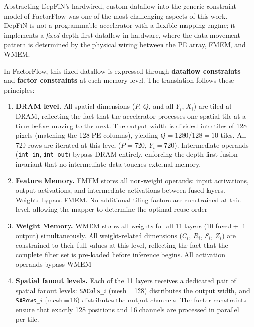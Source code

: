 Abstracting DepFiN's hardwired, custom dataflow into the generic
constraint model of FactorFlow was one of the most challenging aspects
of this work.
DepFiN is not a programmable accelerator with a flexible mapping
engine; it implements a \emph{fixed} depth-first dataflow in hardware,
where the data movement pattern is determined by the physical wiring
between the PE array, FMEM, and WMEM.

In FactorFlow, this fixed dataflow is expressed through
\textbf{dataflow constraints} and \textbf{factor constraints} at each
memory level.
The translation follows these principles:

\begin{enumerate}
  \item \textbf{DRAM level.}
        All spatial dimensions ($P$, $Q$, and all $Y_i$, $X_i$) are
        tiled at DRAM, reflecting the fact that the accelerator
        processes one spatial tile at a time before moving to the next.
        The output width is divided into tiles of 128 pixels (matching
        the 128 PE columns), yielding $Q = 1280/128 = 10$ tiles.
        All 720 rows are iterated at this level ($P = 720$, $Y_i = 720$).
        Intermediate operands (\texttt{int\_in}, \texttt{int\_out}) bypass
        DRAM entirely, enforcing the depth-first fusion invariant that
        no intermediate data touches external memory.

  \item \textbf{Feature Memory.}
        FMEM stores all non-weight operands: input activations, output
        activations, and intermediate activations between fused layers.
        Weights bypass FMEM.
        No additional tiling factors are constrained at this level,
        allowing the mapper to determine the optimal reuse order.

  \item \textbf{Weight Memory.}
        WMEM stores all weights for all 11 layers (10 fused +~1 output)
        simultaneously.
        All weight-related dimensions ($C_i$, $R_i$, $S_i$, $Z_i$)
        are constrained to their full values at this level, reflecting
        the fact that the complete filter set is pre-loaded before
        inference begins.
        All activation operands bypass WMEM.

  \item \textbf{Spatial fanout levels.}
        Each of the 11 layers receives a dedicated pair of spatial
        fanout levels: \texttt{SACols\_$i$} (mesh\,=\,128) distributes
        the output width, and \texttt{SARows\_$i$} (mesh\,=\,16)
        distributes the output channels.
        The factor constraints ensure that exactly 128 positions and
        16 channels are processed in parallel per tile.


\end{enumerate}
